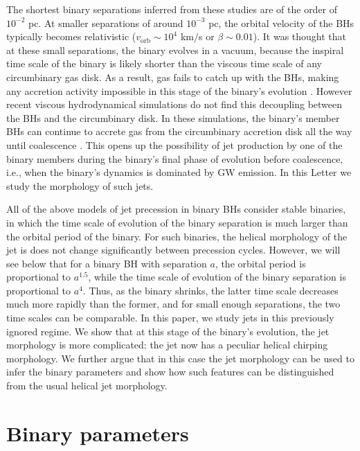 \documentclass[a4paper,fleqn,usenatbib]{mnras}
\begin{document}
The shortest binary separations inferred from these studies are of the
order of $10^{-2}$ pc.  At smaller separations of around $10^{-3}$ pc,
the orbital velocity of the BHs typically becomes relativistic
($v_\mathrm{orb}\sim 10^4$ km$/$s or $\beta\sim 0.01$).  It was
thought that at these small separations, the binary evolves in a
vacuum, because the inspiral time scale of the binary is likely
shorter than the viscous time scale of any circumbinary gas disk.  As
a result, gas fails to catch up with the BHs, making any accretion
activity impossible in this stage of the binary's evolution
\citep{2005ApJ...622L..93M, 2010PhRvD..81b4019S, 2010ApJ...714..404T}.
However recent viscous hydrodynamical simulations do not find this
decoupling between the BHs and the circumbinary disk.  In these
simulations, the binary's member BHs can continue to accrete gas from
the circumbinary accretion disk all the way until coalescence
\citep{2012PhRvL.109v1102F, 2013MNRAS.436.2997D, 2014PhRvD..89f4060G,
  2014PhRvD..90j4030G, 2015MNRAS.446L..36F, 2015ApJ...807..131S}.
This opens up the possibility of jet production by one of the binary
members during the binary's final phase of evolution before
coalescence, i.e., when the binary's dynamics is dominated by GW
emission.  In this Letter we study the morphology of such jets.

All of the above models of jet precession in binary BHs consider
stable binaries, in which the time scale of evolution of the binary
separation is much larger than the orbital period of the binary.  For
such binaries, the helical morphology of the jet is does not change
significantly between precession cycles.  However, we will see below
that for a binary BH with separation $a$, the orbital period is
proportional to $a^{1.5}$, while the time scale of evolution of the
binary separation is proportional to $a^{4}$.  Thus, as the binary
shrinks, the latter time scale decreases much more rapidly than the
former, and for small enough separations, the two time scales can be
comparable.  In this paper, we study jets in this previously ignored
regime.  We show that at this stage of the binary's evolution, the jet
morphology is more complicated: the jet now has a peculiar helical
chirping morphology.  We further argue that in this case the jet
morphology can be used to infer the binary parameters and show how
such features can be distinguished from the usual helical jet
morphology.

\section{Binary parameters}
\end{document}
